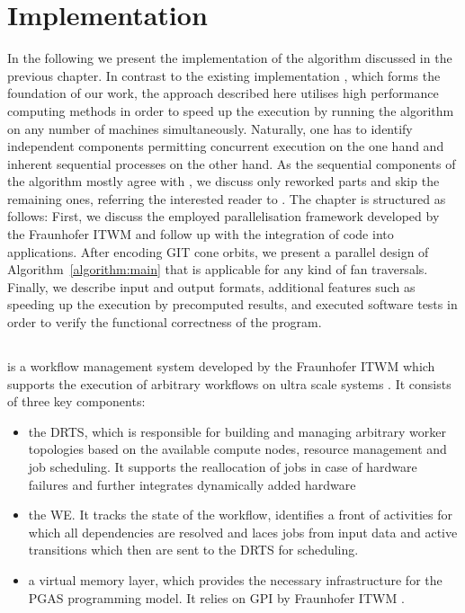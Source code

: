 \chapter{Implementation}
\label{chap:implementation}

In the following we present the implementation of the algorithm discussed in the previous chapter. In contrast to the existing \singular{} implementation \gitfanlib{} \cite{gitfanlib}, which forms the foundation of our work, the approach described here utilises high performance computing methods in order to speed up the execution by running the algorithm on any number of machines simultaneously. Naturally, one has to identify independent components permitting concurrent execution on the one hand and inherent sequential processes on the other hand. As the sequential components of the algorithm mostly agree with \gitfanlib{}, we discuss only reworked parts and skip the remaining ones, referring the interested reader to \cite{gitfanlib}. The chapter is structured as follows: First, we discuss the employed parallelisation framework \gpispace{} developed by the \ac{Fraunhofer ITWM} and follow up with the integration of \singular{} code into \gpispace{} applications. After encoding GIT cone orbits, we present a parallel design of Algorithm~\ref{algorithm:main} that is applicable for any kind of fan traversals. Finally, we describe input and output formats, additional features such as speeding up the execution by precomputed results, and executed software tests in order to verify the functional correctness of the program.

\section{\gpispace}

\gpispace{} is a workflow management system developed by the \ac{Fraunhofer ITWM} which supports the execution of arbitrary workflows on ultra scale systems \cite{gpispace}. It consists of three key components: 
\begin{itemize}
	\item the \ac{DRTS}, which is responsible for building and managing arbitrary worker topologies based on the available compute nodes, resource management and job scheduling. It supports the reallocation of jobs in case of hardware failures and further integrates dynamically added hardware
	\item the \ac{WE}. It tracks the state of the workflow, identifies a front of activities for which all dependencies are resolved and laces jobs from input data and active transitions which then are sent to the \ac{DRTS} for scheduling.
	\item a virtual memory layer, which provides the necessary infrastructure for the \ac{PGAS} programming model. It relies on \textsc{GPI} by \ac{Fraunhofer ITWM} \cite{gpi}.
\end{itemize}

